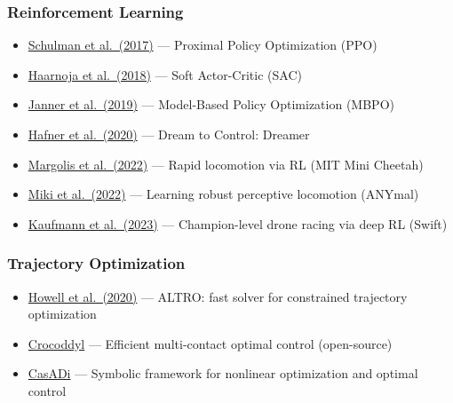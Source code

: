 \subsubsection*{Reinforcement Learning}
\begin{itemize}[nosep]
    \item \href{https://arxiv.org/abs/1707.06347}{Schulman et al.\ (2017)} --- Proximal Policy Optimization (PPO)
    \item \href{https://arxiv.org/abs/1801.01290}{Haarnoja et al.\ (2018)} --- Soft Actor-Critic (SAC)
    \item \href{https://arxiv.org/abs/1906.08253}{Janner et al.\ (2019)} --- Model-Based Policy Optimization (MBPO)
    \item \href{https://arxiv.org/abs/1912.01603}{Hafner et al.\ (2020)} --- Dream to Control: Dreamer
    \item \href{https://arxiv.org/abs/2208.07855}{Margolis et al.\ (2022)} --- Rapid locomotion via RL (MIT Mini Cheetah)
    \item \href{https://arxiv.org/abs/2109.11978}{Miki et al.\ (2022)} --- Learning robust perceptive locomotion (ANYmal)
    \item \href{https://arxiv.org/abs/2310.08984}{Kaufmann et al.\ (2023)} --- Champion-level drone racing via deep RL (Swift)
\end{itemize}

\subsubsection*{Trajectory Optimization}
\begin{itemize}[nosep]
    \item \href{https://arxiv.org/abs/2007.01850}{Howell et al.\ (2020)} --- ALTRO: fast solver for constrained trajectory optimization
    \item \href{https://github.com/loco-3d/crocoddyl}{Crocoddyl} --- Efficient multi-contact optimal control (open-source)
    \item \href{https://web.casadi.org/}{CasADi} --- Symbolic framework for nonlinear optimization and optimal control
\end{itemize}

